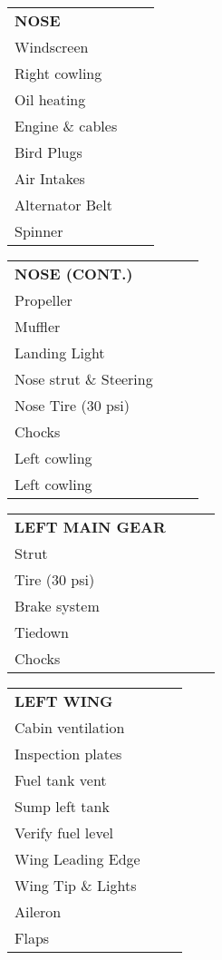 \documentclass[10pt]{article}
\newenvironment{checklist}[1]{%
  \renewcommand{\item}[2]{%
    ##1\hspace{2em}\dotfill\makebox{\uppercase{##2}}\\
  }
  \newcommand{\step}[1]{%
    \hspace*{10em}-\hspace*{\labelsep}##1\\
  }
  \begin{tabular}{p{0.8\linewidth}}
       \multicolumn{1}{l}{\textbf{\uppercase{#1}}}\\
}{\end{tabular}\vspace{1em}}
\begin{document}
\begin{multicols}{2}
\begin{checklist}{Nose}
  \item{Windscreen}{clean}
  \item{Right cowling}{open}
  \item{Oil heating}{check}
  \item{Engine \& cables}{clean}
  \item{Bird Plugs}{remove}
  \item{Air Intakes}{check}
  \item{Alternator Belt}{check}
  \item{Spinner}{check}
\end{checklist}

\begin{checklist}{Nose (cont.)}
  \item{Propeller}{check}
  \item{Muffler}{check}
  \item{Landing Light}{check}
  \item{Nose strut \& Steering}{check}
  \item{Nose Tire (30 psi)}{check}
  \item{Chocks}{remove}
  \item{Left cowling}{open}
  \item{Left cowling}{open}
\end{checklist}

\begin{checklist}{Left main gear}
  \item{Strut}{check}
  \item{Tire (30 psi)}{clear}
  \item{Brake system}{check}
  \item{Tiedown}{remove}
  \item{Chocks}{remove}
\end{checklist}

\begin{checklist}{Left wing}
  \item{Cabin ventilation}{check}
  \item{Inspection plates}{check}
  \item{Fuel tank vent}{check}
  \item{Sump left tank}{point 1, 2}
  \item{Verify fuel level}{}
  \item{Wing Leading Edge}{check}
  \item{Wing Tip \& Lights}{check}
  \item{Aileron}{check}
  \item{Flaps}{check}
\end{checklist}


\end{multicols}
\end{document}

